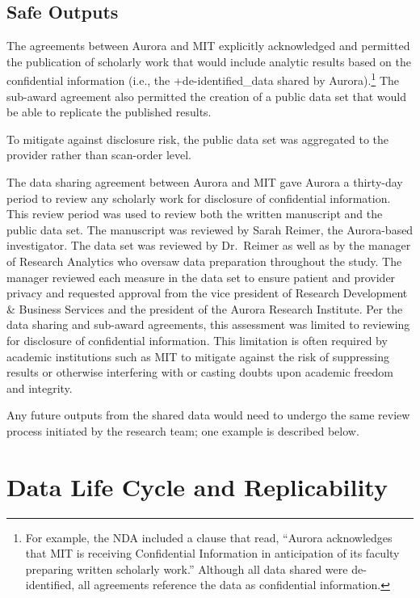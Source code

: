 \documentclass[
]{book}
\begin{document}
\hypertarget{safe-outputs-4}{%
\subsection{Safe Outputs}\label{safe-outputs-4}}

The agreements between Aurora and MIT explicitly acknowledged and permitted the publication of scholarly work that would include analytic results based on the confidential information (i.e., the +de-identified\_data\textbar{} shared by Aurora).\footnote{For example, the NDA included a clause that read, ``Aurora acknowledges that MIT is receiving Confidential Information in anticipation of its faculty preparing written scholarly work.'' Although all data shared were de-identified, all agreements reference the data as confidential information.} The sub-award agreement also permitted the creation of a public data set that would be able to replicate the published results.

To mitigate against disclosure risk, the public data set was aggregated to the provider rather than scan-order level.

The data sharing agreement between Aurora and MIT gave Aurora a thirty-day period to review any scholarly work for disclosure of confidential information. This review period was used to review both the written manuscript and the public data set. The manuscript was reviewed by Sarah Reimer, the Aurora-based investigator. The data set was reviewed by Dr.~Reimer as well as by the manager of Research Analytics who oversaw data preparation throughout the study. The manager reviewed each measure in the data set to ensure patient and provider privacy and requested approval from the vice president of Research Development \& Business Services and the president of the Aurora Research Institute. Per the data sharing and sub-award agreements, this assessment was limited to reviewing for disclosure of confidential information. This limitation is often required by academic institutions such as MIT to mitigate against the risk of suppressing results or otherwise interfering with or casting doubts upon academic freedom and integrity.

Any future outputs from the shared data would need to undergo the same review process initiated by the research team; one example is described below.

\hypertarget{data-life-cycle-and-replicability-3}{%
\section{Data Life Cycle and Replicability}\label{data-life-cycle-and-replicability-3}}
\end{document}
